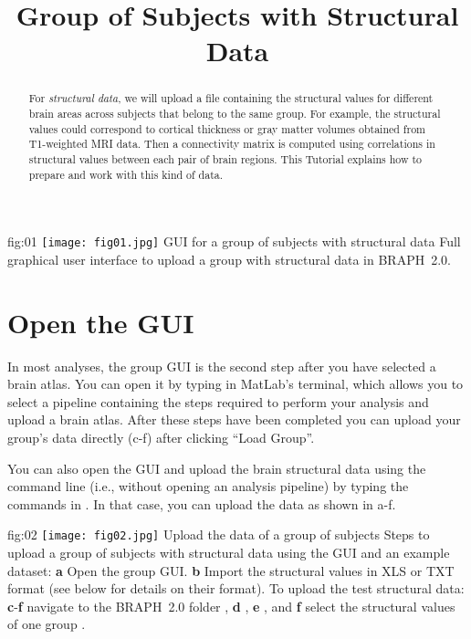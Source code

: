 \documentclass[justified]{tufte-handout}
\title{Group of Subjects with Structural Data}
\begin{document}
\maketitle

\begin{abstract}
\noindent
For \emph{structural data}, we will upload a file containing the structural values for different brain areas across subjects that belong to the same group. For example, the structural values could correspond to cortical thickness or gray matter volumes obtained from T1-weighted MRI data. Then a connectivity matrix is computed using correlations in structural values between each pair of brain regions. This Tutorial explains how to prepare and work with this kind of data.
\end{abstract}

\tableofcontents

	{fig:01}
	{\texttt{[image: fig01.jpg]}}
	{GUI for a group of subjects with structural data}
	{
	Full graphical user interface to upload a group with structural data in BRAPH~2.0. 
	}

\clearpage
\section{Open the GUI}

In most analyses, the group GUI is the second step after you have selected a brain atlas. You can open it by typing  in MatLab's terminal, which allows you to select a pipeline containing the steps required to perform your analysis and upload a brain atlas. After these steps have been completed you can upload your group's data directly (c-f) after clicking ``Load Group''. 

You can also open the GUI and upload the brain structural data using the command line (i.e., without opening an analysis pipeline) by typing the commands in . In that case, you can upload the data as shown in a-f.

	{fig:02}
	{
	\texttt{[image: fig02.jpg]}
	}
	{Upload the data of a group of subjects}
	{
	Steps to upload a group of subjects with structural data using the GUI and an example dataset: 
	{\bf a} Open the group GUI.
	{\bf b} Import the structural values in XLS or TXT format (see below for details on their format).
	To upload the test structural data:
	{\bf c}-{\bf f} navigate to the BRAPH~2.0 folder , {\bf d} ,  {\bf e} , and {\bf f} select the structural values of one group .
	}
\end{document}

